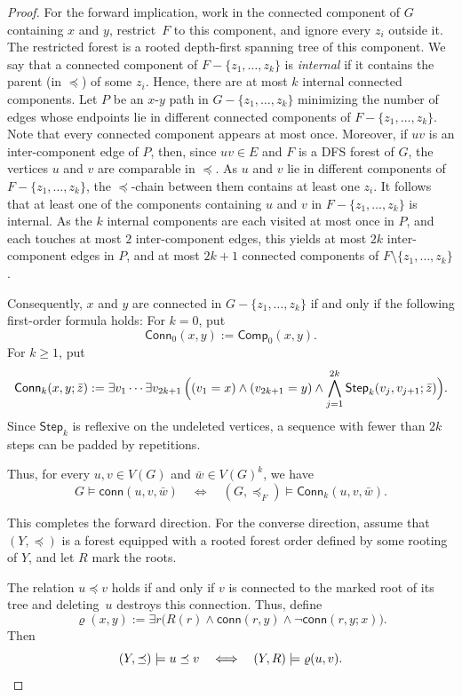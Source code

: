 \documentclass[1p,number,11pt]{elsarticle}
\theoremstyle{plain}
\newcommand{\conn}{\mathsf{conn}}
\renewcommand{\geq}{\geqslant}
\begin{document}
\begin{proof}
For the forward implication, work in the connected component of $G$ containing $x$ and $y$, restrict~$F$ to this component, and ignore every $z_i$ outside it.
The restricted forest is a rooted depth-first spanning tree of this component.
We say that a connected component of $F-\{z_1,\dots,z_k\}$ is \emph{internal} if it contains the parent (in $\preceq$) of some $z_i$. Hence, there are at most $k$ internal connected components. Let $P$ be an $x$-$y$ path in
$G-\{z_1,\dots,z_k\}$ minimizing the number of edges whose endpoints lie in
different connected components of $F-\{z_1,\dots,z_k\}$. Note that every
connected component appears at most once. Moreover, if $uv$ is an
inter-component edge of $P$, then, since $uv\in E$ and $F$ is a DFS forest
of $G$, the vertices $u$ and $v$ are comparable in $\preceq$. As $u$ and $v$
lie in different components of $F-\{z_1,\dots,z_k\}$, the
$\preceq$-chain between them contains at least one $z_i$. It follows that at
least one of the components containing $u$ and $v$ in
$F-\{z_1,\dots,z_k\}$ is internal.
As the $k$ internal components are each visited at most once in $P$, and each touches at most $2$ inter-component edges, this yields at most $2k$ inter-component edges in $P$, and at most $2k+1$
connected components of $F\setminus\{z_1,\dots,z_k\}$.

Consequently, $x$ and $y$ are connected in $G-\{z_1,\dots,z_k\}$ if and only if the following first-order formula holds:
For $k=0$, put
\[
   \mathsf{Conn}_0(x,y):=\mathsf{Comp}_0(x,y).
\]
For $k\geq 1$, put
\[
\mathsf{Conn}_{k}(x,y;\bar z) :=
\exists v_1\cdots \exists v_{2k+1}\,\Bigl((v_1=x)\wedge (v_{2k+1}=y)\wedge
\bigwedge_{j=1}^{2k}
   \mathsf{Step}_{k}(v_j,v_{j+1};\bar z)\Bigr).
\]
Since $\mathsf{Step}_k$ is reflexive on the undeleted vertices, a sequence with fewer than $2k$ steps can be padded by repetitions.

Thus, for every $u,v\in V(G)$ and $\bar w\in V(G)^k$, we have
    \[
    G\models \conn(u,v,\bar w)\quad\iff\quad (G,\preceq_F)\models \mathsf{Conn}_k(u,v,\bar w).
    \]

This completes the forward direction.
For the converse direction, assume that $(Y,\preceq)$ is a forest equipped with a rooted forest order defined by some rooting of $Y$, and let $R$ mark the roots.  

The relation $u\preceq v$ holds if and only if $v$ is connected to the marked
root of its tree and deleting~$u$ destroys this connection. Thus, define
\[
\varrho(x,y):=
   \exists r\bigl(
      R(r)
      \wedge \conn(r,y)
      \wedge \neg\conn(r,y;x)
   \bigr).
\]
Then
\[
(Y,\preceq)\models u\preceq v
\quad\Longleftrightarrow\quad
(Y,R)\models\varrho(u,v).\qedhere
\]
\end{proof}
\end{document}
